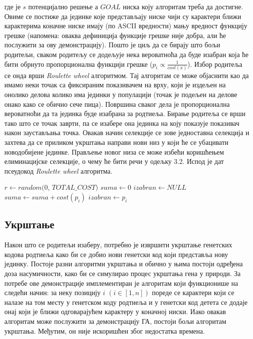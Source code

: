 \documentclass{article}
\begin{document}
\noindent где је $s$ потенцијално решење а $GOAL$ ниска коју алгоритам треба да достигне. Овиме се постиже да 
јединке које представљају ниске чији су карактери ближи карактерима коначне ниске имају (по ASCII вредности) 
мању вредност функцију грешке (напомена: оваква дефиниција функције грешке није 
добра, али ће послужити за ову демонстрацију). Пошто
је циљ да се бирају што бољи родитељи, сваком родитељу се додељује нека вероватноћа да буде изабран
која ће бити обрнуто пропорционална функцији грешке ($p_i \propto \frac{1}{cost(x)}$).
Избор родитеља се онда врши \textit{Roulette wheel} алгоритмом. Тај алгоритам се може објаснити као
да имамо неки точак са фиксираним показивачем на врху, који је издељен на онолико делова колико има јединки у популацији
(точак је подељен на делове онако како се обично сече пица). Површина сваког дела је пропорционална вероватноћи да 
та јединка буде изабрана за родтиеља. Бирање родитеља се врши тако што се точак заврти, па 
се изабере она јединка на коју показује показивач након заустављања точка. Овакав начин селекције
се зове једноставна селекција и захтева да се приликом укрштања направи нови низ у који ће се убацивати
новодобијене јединке. Прављење новог низа се може избећи коришћењем елиминацијске селекције, о чему ће бити
речи у одељку 3.2. Испод је дат псеудокод \textit{Roulette wheel} алгоритма.
\newline
\begin{algorithmic}
\State $r \gets random(0$, $TOTAL\_COST)$
\State $suma \gets 0$
\State $izabran \gets NULL$
    \State $suma \gets suma + cost(p_i)$
        \State $izabran \gets p_i$
    \EndIf
\EndFor
\end{algorithmic}


\subsection{Укрштање}
Након што се родитељи изаберу, потребно је извршити укрштање генетских кодова родтиеља
како би се добио нови генетски код који представља нову јединку. Постоје разни алгоритми укрштања
и обично у њима постоји одређена доза насумичности, како би се симулирао процес укрштања гена у природи.
За потребе ове демонстрације имплементиран је алгоритам који функционише на следећи начин: 
за неку позицију $i$ $(i \in [1, n])$ пореде се карактери који се налазе на том месту у генетском коду родтиеља
и у генетски код детета се додаје онај који је ближи одговарајућем карактеру у коначној ниски. 
Иако овакав алгоритам може послужити за демонстрацију ГА, постоји бољи алгоритам укрштања. 
Међутим, он није искоришћен због недостатка времена.
\end{document}
